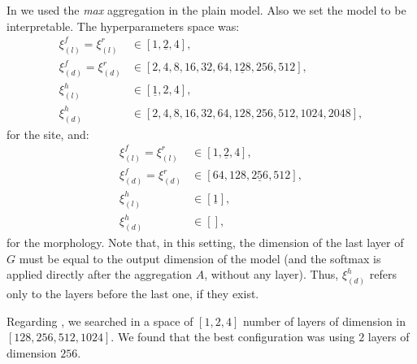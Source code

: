 In \maxi{} we used the \emph{max} aggregation in the plain
model. Also we set the model to be interpretable. The hyperparameters
space was: 
\begin{align*}
  \xi_{(l)}^f=\xi_{(l)}^r&\in[1,\underline{2},4],\\
  \xi_{(d)}^f=\xi_{(d)}^r&\in[2,4,8,16,32,64,\underline{128},256,512],\\
  \xi_{(l)}^h&\in[\underline{1},2,4],\\
  \xi_{(d)}^h&\in[2,4,8,16,32,64,128,256,512,1024,2048],
\end{align*}
for the site, and:
\begin{align*}
  \xi_{(l)}^f=\xi_{(l)}^r&\in[1,\underline{2},4],\\
  \xi_{(d)}^f=\xi_{(d)}^r&\in[64,128,\underline{256},512],\\
  \xi_{(l)}^h&\in[\underline{1}],\\
  \xi_{(d)}^h&\in[],
\end{align*}
for the morphology. Note that, in this setting, the dimension of the
last layer of $G$ must be equal to the output dimension of the model
(and the softmax is applied directly after the aggregation $A$,
without any layer). Thus, $\xi_{(d)}^h$ refers only to the
layers before the last one, if they exist.

Regarding \gru{}, we searched in a space of $[1,2,4]$ number of layers of
dimension in $[128,256,512,1024]$. We found that the best
configuration was using $2$ layers of dimension $256$.





